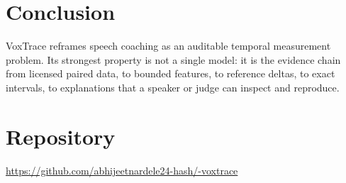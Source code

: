 \documentclass[10pt]{article}
\begin{document}
\section{Conclusion}
VoxTrace reframes speech coaching as an auditable temporal measurement problem. Its strongest property is not a single model: it is the evidence chain from licensed paired data, to bounded features, to reference deltas, to exact intervals, to explanations that a speaker or judge can inspect and reproduce.

\section*{Repository}
\url{https://github.com/abhijeetnardele24-hash/-voxtrace}
\end{document}
